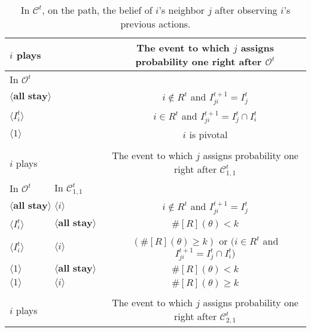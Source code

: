 \documentclass[12pt,letter]{article}
\newcommand{\Kappa}{\mathcal{C}}
\newcommand{\Omicron}{\mathcal{O}}
\theoremstyle{definition}
\theoremstyle{remark}
\theoremstyle{claim}
\begin{document}
\begin{table}[!htbp]
\caption{In $\Kappa^t$, on the path, the belief of $i$'s neighbor $j$ after observing $i$'s previous actions.}
\label{Table_blf_cdt}
\begin{center}
\begin{tabular}{l l l | c}
 $i$ plays  	&&	&	 The event to which $j$ assigns probability one right after $\Omicron^t$\\
\hline
\hline
 In $\Omicron^t$		&&&					 \\
\hline
$\langle \textbf{all stay} \rangle$  &&&     $i\notin R^t$ and $I^{t+1}_{ji}=I^t_j$ \\
$\langle I^t_{i} \rangle$  &&&     $i\in R^t$ and $I^{t+1}_{ji}=I^t_j\cap I^t_{i}$ \\
$\langle 1 \rangle$  &&& 	  $i$ is pivotal    \\
\hline
\\
 $i$ plays	&&			  & The event to which $j$ assigns probability one right after $\Kappa^t_{1,1}$\\
\hline
\hline
	  In $\Omicron^t$	 	&		In $\Kappa^t_{1,1}$	&		&		  \\
\hline
$\langle \textbf{all stay} \rangle$  & $\langle i \rangle$	&&    $i\notin R^t$ and $I^{t+1}_{ji}=I^t_j$  \\
$\langle I^t_{i} \rangle$  & $\langle \textbf{all stay} \rangle$	&&    $\#[R](\theta)< k$ \\
$\langle I^t_{i} \rangle$  & $\langle i \rangle$	&&   $(\#[R](\theta)\geq k )$ or $(i\in R^t$ and $I^{t+1}_{ji}=I^t_j\cap I^t_{i})$\\
$\langle 1 \rangle$  & $\langle \textbf{all stay} \rangle$	&&	  $\#[R](\theta)< k$    \\
$\langle 1 \rangle$  & $\langle i \rangle$	&&	  $\#[R](\theta)\geq k$  \\
\hline
\\
 $i$ plays  	&		&  	  &The event to which $j$ assigns probability one right after $\Kappa^t_{2,1}$\\

\end{tabular}
\end{center}
\end{table}
\end{document}
